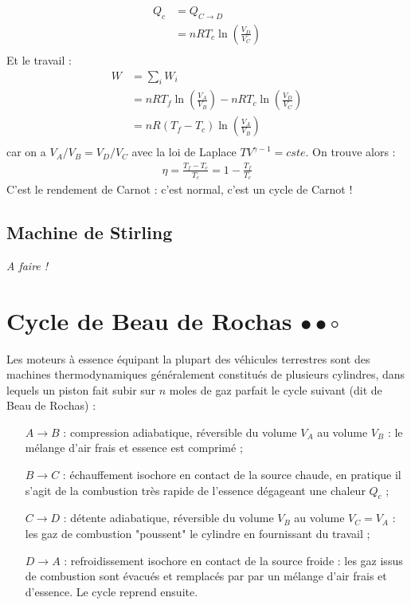 \documentclass{report}
\begin{document}
\begin{itemize}
\begin{align*}
	Q_c&=Q_{C\rightarrow D}\\
	&=nRT_c\ln\left(\frac{V_D}{V_C} \right)\\
\end{align*}		
Et le travail :	
\begin{align*}
	W&=\sum_i W_i\\
	&=nRT_f\ln\left(\frac{V_A}{V_B} \right)-nRT_c\ln\left(\frac{V_D}{V_C} \right)\\
	&=nR(T_f - T_c)\ln\left(\frac{V_A}{V_B} \right)\\
\end{align*}		
car on a $V_A/V_B=V_D/V_C$ avec la loi de Laplace $TV^{\gamma-1}=cste$.
On trouve alors :
\begin{align*}
	\eta=\frac{T_f-T_c}{T_c}=1-\frac{T_f}{T_c}
\end{align*}
C'est le rendement de Carnot : c'est normal, c'est un cycle de Carnot !

\subsection*{Machine de Stirling}

\textit{A faire !}

\end{itemize}

\newpage

\section*{Cycle de Beau de Rochas $\bullet\bullet\circ$}

Les moteurs à essence équipant la plupart des véhicules terrestres sont des machines thermodynamiques généralement constitués de plusieurs cylindres, dans lequels un piston fait subir sur $n$ moles de gaz parfait le cycle suivant (dit de Beau de Rochas) :

\begin{itemize}

\item[$A \rightarrow B$ :] compression adiabatique, réversible du volume $V_A$ au volume $V_B$ : le mélange d'air frais et essence est comprimé ;
\item[$B \rightarrow C$ :] échauffement isochore en contact de la source chaude, en pratique il s'agit de la combustion très rapide de l'essence dégageant une chaleur $Q_c$ ;
\item[$C \rightarrow D$ :] détente adiabatique, réversible du volume $V_B$ au volume $V_C=V_A$ : les gaz de combustion "poussent" le cylindre en fournissant du travail ;
\item[$D \rightarrow A$ :] refroidissement isochore en contact de la source froide : les gaz issus de combustion sont évacués et remplacés par par un mélange d'air frais et d'essence. Le cycle reprend ensuite.

\end{itemize}
\end{document}
